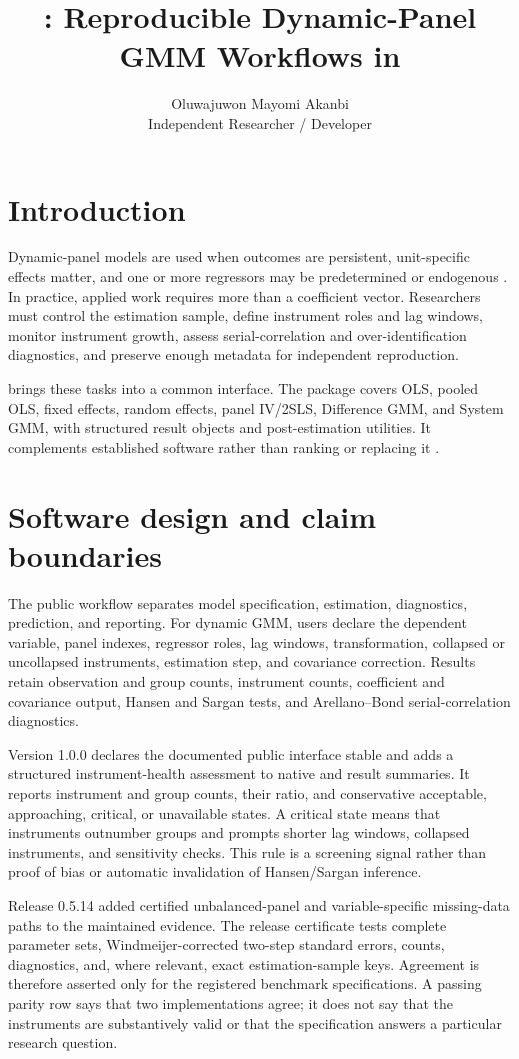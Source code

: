 \documentclass[article]{jss}
\author{Oluwajuwon Mayomi Akanbi\\Independent Researcher / Developer}
\title{\pkg{systemgmmkit}: Reproducible Dynamic-Panel GMM Workflows in \proglang{Python}}
\begin{document}
\section{Introduction}
Dynamic-panel models are used when outcomes are persistent, unit-specific effects matter, and one or more
regressors may be predetermined or endogenous \citep{arellano1991some,blundell1998initial,bond2002dynamic}.
In practice, applied work requires more than a coefficient vector. Researchers must control the estimation
sample, define instrument roles and lag windows, monitor instrument growth, assess serial-correlation and
over-identification diagnostics, and preserve enough metadata for independent reproduction.

 brings these tasks into a common  interface. The package covers OLS, pooled OLS,
fixed effects, random effects, panel IV/2SLS, Difference GMM, and System GMM, with structured result objects and
post-estimation utilities. It complements established software rather than ranking or replacing it
\citep{roodman2009xtabond2,croissant2008panel,seabold2010statsmodels,sheppard2024linearmodels,pydynpd}.

\section{Software design and claim boundaries}
The public workflow separates model specification, estimation, diagnostics, prediction, and reporting. For
dynamic GMM, users declare the dependent variable, panel indexes, regressor roles, lag windows,
transformation, collapsed or uncollapsed instruments, estimation step, and covariance correction. Results
retain observation and group counts, instrument counts, coefficient and covariance output, Hansen and Sargan
tests, and Arellano--Bond serial-correlation diagnostics.

Version 1.0.0 declares the documented public interface stable and adds a structured instrument-health
assessment to native and  result summaries. It reports instrument and group counts, their
ratio, and conservative acceptable, approaching, critical, or unavailable states. A critical state means
that instruments outnumber groups and prompts shorter lag windows, collapsed instruments, and sensitivity
checks. This rule is a screening signal rather than proof of bias or automatic invalidation of Hansen/Sargan
inference.

Release 0.5.14 added certified unbalanced-panel and variable-specific missing-data paths to the maintained
 evidence. The release certificate tests complete parameter sets, Windmeijer-corrected
two-step standard errors, counts, diagnostics, and, where relevant, exact estimation-sample keys. Agreement is
therefore asserted only for the registered benchmark specifications. A passing parity row says that two
implementations agree; it does not say that the instruments are substantively valid or that the specification
answers a particular research question.
\end{document}
